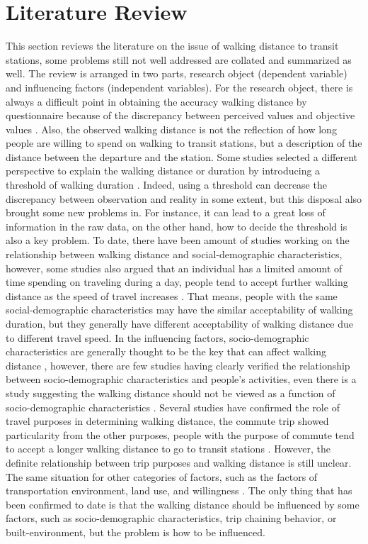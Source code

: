 \documentclass[Journal,letterpaper]{ascelike-new}
\begin{document}
\section{Literature Review}
This section reviews the literature on the issue of walking distance to transit stations, some problems still not well addressed are collated and summarized as well. The review is arranged in two parts, research object (dependent variable) and influencing factors (independent variables).
%
For the research object, there is always a difficult point in obtaining the accuracy walking distance by questionnaire because of the discrepancy between perceived values and objective values \cite{BadlandHannahMandSchofieldGrantMandSchluter2007,McCormack2008}. Also, the observed walking distance is not the reflection of how long people are willing to spend on walking to transit stations, but a description of the distance between the departure and the station. Some studies selected a different perspective to explain the walking distance or duration by introducing a threshold of walking duration \cite{Besser2005,McCormack2008}. Indeed, using a threshold can decrease the discrepancy between observation and reality in some extent, but this disposal also brought some new problems in. For instance, it can lead to a great loss of information in the raw data, on the other hand, how to decide the threshold is also a key problem. To date, there have been amount of studies working on the relationship between walking distance and social-demographic characteristics, however, some studies also argued that an individual has a limited amount of time spending on traveling during a day, people tend to accept further walking distance as the speed of travel increases \cite{Marchetti1994,Larsen2010}. That means, people with the same social-demographic characteristics may have the similar acceptability of walking duration, but they generally have different acceptability of walking distance due to different travel speed.
%
In the influencing factors, socio-demographic characteristics are generally thought to be the key that can affect walking distance \cite{Besser2005,WeinsteinAgrawal2008,Krygsman2004,Yang2012,Daniels2013,Guerra2012}, however, there are few studies having clearly verified the relationship between socio-demographic characteristics and people’s activities, even there is a study suggesting the walking distance should not be viewed as a function of socio-demographic characteristics \cite{Krygsman2004}. Several studies have confirmed the role of travel purposes in determining walking distance, the commute trip showed particularity from the other purposes, people with the purpose of commute tend to accept a longer walking distance to go to transit stations \cite{Larsen2010}. However, the definite relationship between trip purposes and walking distance is still unclear. The same situation for other categories of factors, such as the factors of transportation environment, land use, and willingness \cite{Guerra2012,Krygsman2004,WeinsteinAgrawal2008}. The only thing that has been confirmed to date is that the walking distance should be influenced by some factors, such as socio-demographic characteristics, trip chaining behavior, or built-environment, but the problem is how to be influenced.
\end{document}
